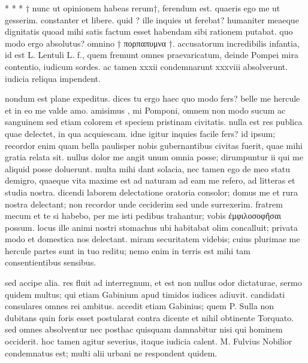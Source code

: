 


 * * * † nunc ut opinionem habeas rerum†, ferendum est. quaeris ego me ut gesserim. constanter et libere. quid ? ille inquies ut ferebat? humaniter meaeque dignitatis quoad mihi satis factum esset habendam sibi rationem putabat. quo modo ergo absolutus? omnino † πορπαπυμνα †. accusatorum incredibilis infantia, id est L. Lentuli L. f., quem fremunt omnes praevaricatum, deinde Pompei mira contentio, iudicum sordes. ac tamen xxxii condemnarunt xxxviii absolverunt. iudicia reliqua impendent.

 nondum est plane expeditus. dices tu ergo haec quo modo fers? belle me hercule et in eo me valde amo. amisimus , mi Pomponi, omnem non modo sucum ac sanguinem sed etiam colorem et speciem pristinam civitatis. nulla est res publica quae delectet, in qua acquiescam. idne igitur inquies facile fers? id ipsum; recordor enim quam bella paulisper nobis gubernantibus civitas fuerit, quae mihi gratia relata sit. nullus dolor me angit unum omnia posse; dirumpuntur ii qui me aliquid posse doluerunt. multa mihi dant solacia, nec tamen ego de meo statu demigro, quaeque vita maxime est ad naturam ad eam me refero, ad litteras et studia nostra. dicendi laborem delectatione oratoria consolor; domus me et rura nostra delectant; non recordor unde ceciderim sed unde surrexerim. fratrem mecum et te si habebo, per me isti pedibus trahantur; vobis ἐμφιλοσοφῆσαι possum. locus ille animi nostri stomachus ubi habitabat olim concalluit; privata modo et domestica nos delectant. miram securitatem videbis; cuius plurimae me hercule partes sunt in tuo reditu; nemo enim in terris est mihi tam consentientibus sensibus.

 sed accipe alia. res fluit ad interregnum, et est non nullus odor dictaturae, sermo quidem multus; qui etiam Gabinium apud timidos iudices adiuvit. candidati consulares omnes rei ambitus. accedit etiam Gabinius; quem P. Sulla non dubitans quin foris esset postularat contra dicente et nihil obtinente Torquato. sed omnes absolventur nec posthac quisquam damnabitur nisi qui hominem occiderit. hoc tamen agitur severius, itaque iudicia calent. M. Fulvius Nobilior condemnatus est; multi alii urbani ne respondent quidem.

